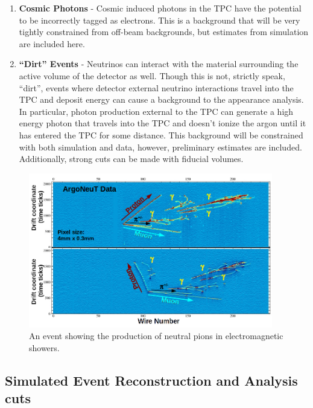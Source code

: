 \begin{enumerate}
  \item {\bf Cosmic Photons} - Cosmic induced photons in the TPC have the potential to be incorrectly tagged as electrons. This is a background that will be very tightly constrained from off-beam backgrounds, but estimates from simulation are included here.

  \item{\bf ``Dirt'' Events} - Neutrinos can interact with the material surrounding the active volume of the detector as well.  Though this is not, strictly speak, ``dirt'', events where detector external neutrino interactions travel into the TPC and deposit energy can cause a background to the \nue appearance analysis.  In particular, photon production external to the TPC can generate a high energy photon that travels into the TPC and doesn't ionize the argon until it has entered the TPC for some distance.  This background will be constrained with both simulation and data, however, preliminary estimates are included.  Additionally, strong cuts can be made with fiducial volumes.

\end{enumerate}

\begin{figure}[htbp]
  \centering
  \includegraphics[width=0.95\textwidth]{sbn_figures/ArgoNeuT_Labels.png}
  \caption[\argoneut $\pi^0$ Event]{An \argoneut event showing the production of neutral pions in electromagnetic showers.}
  \label{fig:argo_pi0}
\end{figure}

\subsection{Simulated Event Reconstruction and Analysis cuts}
\label{subsection:event_reco}

